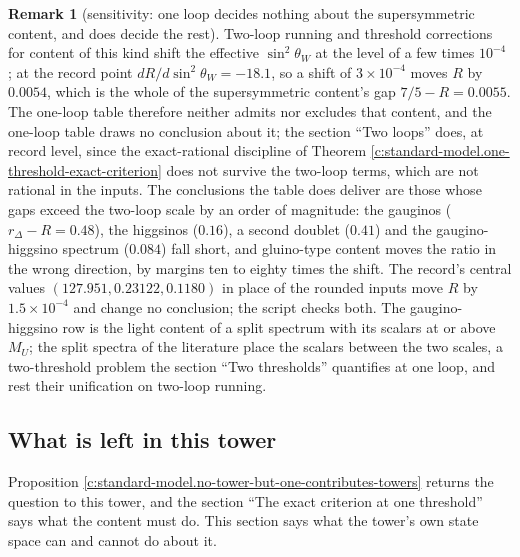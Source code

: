 \documentclass[11pt]{article}
\theoremstyle{definition}
\newtheorem{remark}[theorem]{Remark}
\theoremstyle{plain}
\providecommand{\Dl}{}\renewcommand{\Dl}{\Delta}
\begin{document}
\begin{remark}[sensitivity: one loop decides nothing about the supersymmetric content, and does decide the rest]\label{c:note.standard-model.sensitivity-one-loop-decides-nothing-about}
Two-loop running and threshold corrections for content of this kind shift the effective $\sin^{2}\theta_{W}$ at the level of a few times $10^{-4}$ \cite{Amaldi1991, DimopoulosRabyWilczek1981}; at the record point $dR/d\sin^{2}\theta_{W} = -18.1$, so a shift of $3 \times 10^{-4}$ moves $R$ by $0.0054$, which is the whole of the supersymmetric content's gap $7/5 - R = 0.0055$. The one-loop table therefore neither admits nor excludes that content, and the one-loop table draws no conclusion about it; the section ``Two loops'' does, at record level, since the exact-rational discipline of Theorem \ref{c:standard-model.one-threshold-exact-criterion} does not survive the two-loop terms, which are not rational in the inputs. The conclusions the table does deliver are those whose gaps exceed the two-loop scale by an order of magnitude: the gauginos ($r_{\Dl} - R = 0.48$), the higgsinos ($0.16$), a second doublet ($0.41$) and the gaugino-higgsino spectrum ($0.084$) fall short, and gluino-type content moves the ratio in the wrong direction, by margins ten to eighty times the shift. The record's central values $(127.951, 0.23122, 0.1180)$ in place of the rounded inputs move $R$ by $1.5 \times 10^{-4}$ and change no conclusion; the script checks both. The gaugino-higgsino row is the light content of a split spectrum with its scalars at or above $M_{U}$; the split spectra of the literature \cite{GiudiceRomanino2004, ArkaniHamedDimopoulos2005} place the scalars between the two scales, a two-threshold problem the section ``Two thresholds'' quantifies at one loop, and rest their unification on two-loop running.
\end{remark}

\subsection*{What is left in this tower}
\label{c:note.standard-model.setting-what-left-tower}
Proposition \ref{c:standard-model.no-tower-but-one-contributes-towers} returns the question to this tower, and the section ``The exact criterion at one threshold'' says what the content must do. This section says what the tower's own state space can and cannot do about it.
\end{document}
